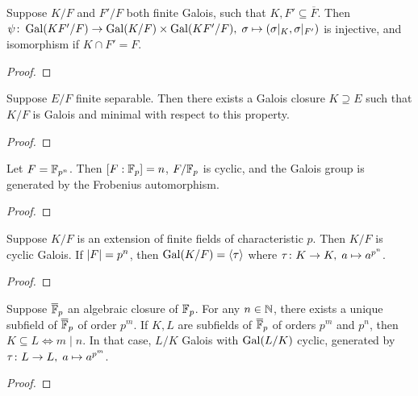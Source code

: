\begin{theorem}
    Suppose \(K/F\) and \(F'/F\) both finite Galois,
    such that \(K,F' \subseteq \overline{F}\).
    Then \(\psi\colon\operatorname{Gal}(KF'/F)\to\operatorname{Gal}(K/F)\times\operatorname{Gal}(KF'/F),\;\sigma\mapsto(\sigma\vert_K,\sigma\vert_{F'})\)
    is injective,
    and isomorphism if \(K \cap F' = F\).
\end{theorem}
\begin{proof}
\end{proof}

\begin{corollary}
    Suppose \(E/F\) finite separable.
    Then there exists a Galois closure \(K \supseteq E\) such that
    \(K/F\) is Galois and minimal with respect to this property.
\end{corollary}
\begin{proof}
\end{proof}


\begin{theorem}
    Let \(F = \mathbb{F}_{p^n}\).
    Then \([F:\mathbb{F}_p] = n\), \(F/\mathbb{F}_p\) is cyclic,
    and the Galois group is generated by the Frobenius automorphism.
\end{theorem}
\begin{proof}
\end{proof}
\begin{corollary}
    Suppose \(K/F\) is an extension of finite fields of characteristic \(p\).
    Then \(K/F\) is cyclic Galois.
    If \(\abs{F} = p^n\), then \(\operatorname{Gal}(K/F) = \langle\tau\rangle\)
    where \(\tau\colon K\to K,\;a\mapsto a^{p^n}\).
\end{corollary}
\begin{proof}
\end{proof}

\begin{theorem}
    Suppose \(\overline{\mathbb{F}}_p\) an algebraic closure of \(\mathbb{F}_p\).
    For any \(n \in \mathbb{N}\),
    there exists a unique subfield of \(\overline{\mathbb{F}}_p\) of order \(p^m\).
    If \(K,L\) are subfields of \(\overline{\mathbb{F}}_p\) of orders \(p^m\) and \(p^n\),
    then \(K \subseteq L \iff m \mid n\).
    In that case, \(L/K\) Galois with \(\operatorname{Gal}(L/K)\) cyclic,
    generated by \(\tau\colon L\to L,\;a\mapsto a^{p^m}\).
\end{theorem}
\begin{proof}
\end{proof}

